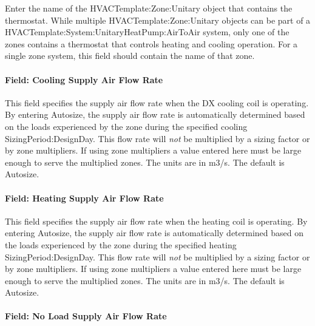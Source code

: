 Enter the name of the HVACTemplate:Zone:Unitary object that contains the thermostat. While multiple HVACTemplate:Zone:Unitary objects can be part of a HVACTemplate:System:UnitaryHeatPump:AirToAir system, only one of the zones contains a thermostat that controls heating and cooling operation. For a single zone system, this field should contain the name of that zone.

\paragraph{Field: Cooling Supply Air Flow Rate}\label{field-cooling-supply-air-flow-rate-4}

This field specifies the supply air flow rate when the DX cooling coil is operating. By entering Autosize, the supply air flow rate is automatically determined based on the loads experienced by the zone during the specified cooling SizingPeriod:DesignDay. This flow rate will \emph{not} be multiplied by a sizing factor or by zone multipliers. If using zone multipliers a value entered here must be large enough to serve the multiplied zones. The units are in m3/s. The default is Autosize.

\paragraph{Field: Heating Supply Air Flow Rate}\label{field-heating-supply-air-flow-rate-4}

This field specifies the supply air flow rate when the heating coil is operating. By entering Autosize, the supply air flow rate is automatically determined based on the loads experienced by the zone during the specified heating SizingPeriod:DesignDay. This flow rate will \emph{not} be multiplied by a sizing factor or by zone multipliers. If using zone multipliers a value entered here must be large enough to serve the multiplied zones. The units are in m3/s. The default is Autosize.

\paragraph{Field: No Load Supply Air Flow Rate}\label{field-no-load-supply-air-flow-rate-3}

